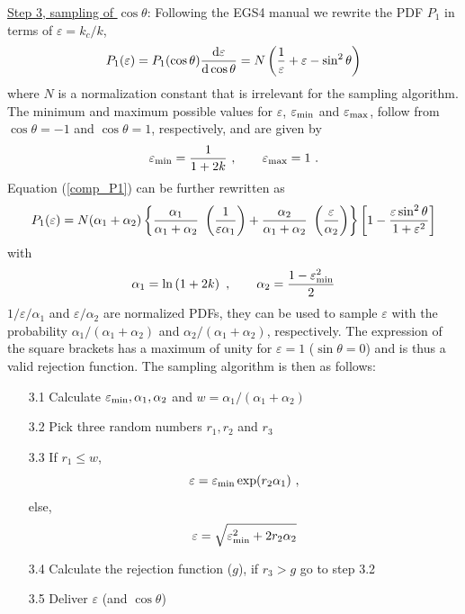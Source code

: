 \underline{Step 3, sampling of $\cos \theta$}: Following
the EGS4 manual\cite{Ne85} we rewrite
the PDF $P_1$ in terms of $\varepsilon = k_c/k$,
\begin{equation}
\label{comp_P1}
P_1(\varepsilon) = P_1(\cos \theta) {{\rm d}\varepsilon \over
{\rm d} \cos \theta} = N \left( \frac{1}{\varepsilon} + \varepsilon -
\sin^2 \theta \right)
\end{equation}
where $N$ is a normalization constant that is irrelevant for the sampling
algorithm. The minimum and maximum possible values for
$\varepsilon$, $\varepsilon_{\rm min}$ and $\varepsilon_{\rm max}$, follow
from $\cos \theta = -1$ and $\cos \theta = 1$, respectively, and are
given by
\begin{equation}
\varepsilon_{{\rm min}} = {1 \over 1 + 2 k}~, \quad \quad
\varepsilon_{{\rm max}} = 1~.
\end{equation}
Equation (\ref{comp_P1}) can be further rewritten as
\begin{equation}
P_1(\varepsilon) = N (\alpha_1 + \alpha_2) \left\{
{\alpha_1 \over \alpha_1 + \alpha_2}~
\left({1 \over \varepsilon \alpha_1} \right)
+ {\alpha_2 \over \alpha_1 + \alpha_2}~\left({ \varepsilon \over \alpha_2}
\right) \right\} \left[ 1 - {\varepsilon \sin^2 \theta \over 1 +
\varepsilon^2 } \right]
\end{equation}
with
\begin{equation}
\alpha_1  =  \ln \left(1 + 2 k \right)~, \quad \quad
\alpha_2  = {1 - \varepsilon_{\rm min}^2 \over 2}
\end{equation}
$1/\varepsilon/\alpha_1$ and $\varepsilon/\alpha_2$ are
normalized PDFs, they can be used to sample $\varepsilon$
with the probability $\alpha_1/(\alpha_1 + \alpha_2)$ and
$\alpha_2/(\alpha_1 + \alpha_2)$, respectively. The expression
of the square brackets has a maximum of unity for
$\varepsilon = 1$ ($\sin \theta = 0$) and is thus
a valid rejection function. The sampling algorithm is then as follows:
\begin{itemize}
\item[3.1]
Calculate $\varepsilon_{\rm min}, \alpha_1, \alpha_2$ and
$w = \alpha_1/(\alpha_1 + \alpha_2)$
\item[3.2]
Pick three random numbers $r_1, r_2$ and $r_3$
\item[3.3]
If $r_1 \le w$,
\begin{equation}
\varepsilon = \varepsilon_{\rm min} \exp( r_2 \alpha_1 )~,
\end{equation}
else,
\begin{equation}
\varepsilon = \sqrt{ \varepsilon_{\rm min}^2 + 2 r_2 \alpha_2}
\end{equation}
\item[3.4]
Calculate the rejection function ($g$), if $r_3 > g$ go to step 3.2
\item[3.5]
Deliver $\varepsilon$ (and $\cos \theta$)
\end{itemize}
